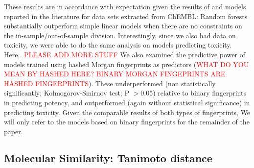 \documentclass{article}
\begin{document}
These results are in accordance with expectation given the results of \citep{et1:} and models reported in the literature for data sets extracted from ChEMBL: Random forests substantially outperform simple linear models when there are no constraints on the in-sample/out-of-sample division.
\newline
\newline
Interestingly, since we also had data on toxicity, we were able to do the same analysis on models predicting toxicity. Here.. \textcolor{red}{PLEASE ADD MORE STUFF}
\newline
\newline
We also examined the predictive power of models trained using hashed Morgan fingerprints as predictors (\textcolor{red}{WHAT DO YOU MEAN BY HASHED HERE? BINARY MORGAN FINGEPRINTS ARE HASHED FINGERPRINTS}). These underperformed (non statistically significantly; Kolmogorov-Smirnov test; P $>$0.05) relative to binary fingerprints in predicting potency, and outperformed (again without statistical significance) in predicting toxicity.  
Given the comparable results of both types of fingerprints, We will only refer to the models based on binary fingerprints for the remainder of the paper.
\newline
\newline



\subsection{Molecular Similarity: Tanimoto distance}
\end{document}
